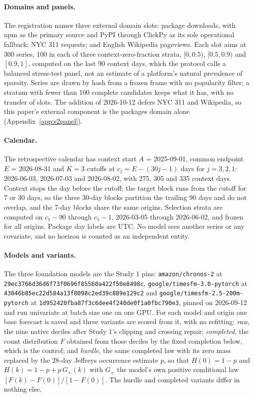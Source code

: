 \paragraph{Domains and panels.} The registration names three external domain slots: package downloads,
with npm as the primary source and PyPI through ClickPy as its sole operational fallback; NYC 311 requests;
and English Wikipedia pageviews. Each slot aims at 300 series, 100 in each of three context-zero-fraction
strata, $[0, 0.5)$, $[0.5, 0.9)$ and $[0.9, 1]$, computed on the last 90 context days, which the protocol
calls a balanced stress-test panel, not an estimate of a platform's natural prevalence of sparsity. Series
are drawn by hash from a frozen frame with no popularity filter; a stratum with fewer than 100 complete
candidates keeps what it has, with no transfer of slots. The addition of 2026-10-12 defers NYC 311 and
Wikipedia, so this paper's external component is the packages domain alone (Appendix~\ref{app:s2panel}).

\paragraph{Calendar.} The retrospective calendar has context start $A$ = 2025-09-01, common endpoint $E$ =
2026-08-31 and $K = 3$ cutoffs at $c_j = E - (30j - 1)$ days for $j = 3, 2, 1$: 2026-06-03, 2026-07-03 and
2026-08-02, with 275, 305 and 335 context days. Context stops the day before the cutoff; the target block
runs from the cutoff for 7 or 30 days, so the three 30-day blocks partition the trailing 90 days and do not
overlap, and the 7-day blocks share the same origins. Selection strata are computed on $c_1 - 90$ through
$c_1 - 1$, 2026-03-05 through 2026-06-02, and frozen for all origins. Package day labels are UTC. No model
sees another series or any covariate, and no horizon is counted as an independent entity.

\begin{sloppypar}
\paragraph{Models and variants.} The three foundation models are the Study 1 pins: \texttt{amazon/chronos-2}
at \texttt{29ec3766d36d6f73f0696f85560a422f50e8498c}, \texttt{google/timesfm-3.0-pytorch} at
\texttt{43046b85ec22d584a13f8098c2ed39c889e129c2} and \texttt{google/timesfm-2.5-200m-pytorch} at
\texttt{1d952420fba87f3c6dee4f240de0f1a0fbc790e3}, pinned on 2026-09-12 and run univariate at batch size one
on one GPU. For each model and origin one base forecast is saved and three variants are scored from it, with
no refitting: \emph{raw}, the nine native deciles after Study 1's clipping and crossing repair;
\emph{completed}, the count distribution $F$ obtained from those deciles by the fixed completion below, which
is the control; and \emph{hurdle}, the same completed law with its zero mass replaced by the 28-day Jeffreys
occurrence estimate $p$, so that $H(0) = 1 - p$ and $H(k) = 1 - p + p\, G_+(k)$ with $G_+$ the model's own
positive conditional law $[F(k) - F(0)] / [1 - F(0)]$. The hurdle and completed variants differ in nothing
else.
\end{sloppypar}

